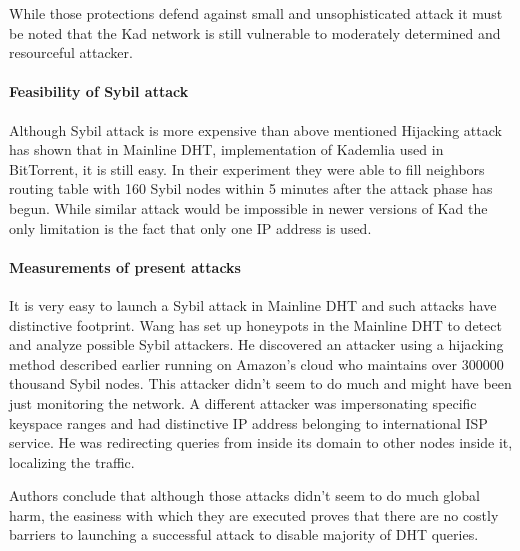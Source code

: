 While those protections defend against small and unsophisticated attack it must
be noted that the Kad network is still vulnerable to moderately determined and
resourceful attacker.

\paragraph{Feasibility of Sybil attack}
Although Sybil attack is more expensive than above mentioned Hijacking attack
\cite{tim11} has shown that in Mainline DHT, implementation of Kademlia used in
BitTorrent, it is still easy. In their experiment they were able to fill
neighbors routing table with 160 Sybil nodes within 5 minutes after the attack
phase has begun. While similar attack would be impossible in newer versions of
Kad the only limitation is the fact that only one IP address is used.

\paragraph{Measurements of present attacks}
It is very easy to launch a Sybil attack in Mainline DHT and such attacks have
distinctive footprint. Wang \cite{wan12a} has set up honeypots in the Mainline
DHT to detect and analyze possible Sybil attackers. He discovered an attacker
using a hijacking method described earlier running on Amazon's cloud who
maintains over 300000 thousand Sybil nodes. This attacker didn't seem to do much
and might have been just monitoring the network. A different attacker was
impersonating specific keyspace ranges and had distinctive IP address belonging
to international ISP service. He was redirecting queries from inside its domain
to other nodes inside it, localizing the traffic.

Authors conclude that although those attacks didn't seem to do much global harm,
the easiness with which they are executed proves that there are no costly
barriers to launching a successful attack to disable majority of DHT queries.
